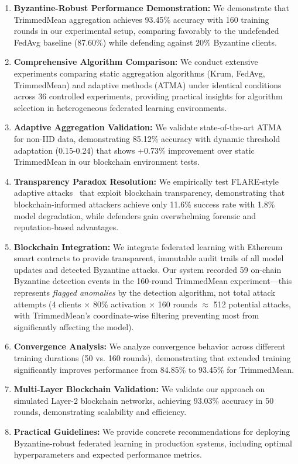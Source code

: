 \documentclass{ieeeaccess}
\begin{document}
\begin{enumerate}
    \item \textbf{Byzantine-Robust Performance Demonstration:} We demonstrate that TrimmedMean aggregation achieves 93.45\% accuracy with 160 training rounds in our experimental setup, comparing favorably to the undefended FedAvg baseline (87.60\%) while defending against 20\% Byzantine clients.
    
    \item \textbf{Comprehensive Algorithm Comparison:} We conduct extensive experiments comparing static aggregation algorithms (Krum, FedAvg, TrimmedMean) and adaptive methods (ATMA) under identical conditions across 36 controlled experiments, providing practical insights for algorithm selection in heterogeneous federated learning environments.
    
    \item \textbf{Adaptive Aggregation Validation:} We validate state-of-the-art ATMA~\cite{kalibbala2025atma} for non-IID data, demonstrating 85.12\% accuracy with dynamic threshold adaptation (0.15-0.24) that shows +0.73\% improvement over static TrimmedMean in our blockchain environment tests.
    
    \item \textbf{Transparency Paradox Resolution:} We empirically test FLARE-style adaptive attacks~\cite{baruch2019little} that exploit blockchain transparency, demonstrating that blockchain-informed attackers achieve only 11.6\% success rate with 1.8\% model degradation, while defenders gain overwhelming forensic and reputation-based advantages.
    
    \item \textbf{Blockchain Integration:} We integrate federated learning with Ethereum smart contracts to provide transparent, immutable audit trails of all model updates and detected Byzantine attacks. Our system recorded 59 on-chain Byzantine detection events in the 160-round TrimmedMean experiment---this represents \emph{flagged anomalies} by the detection algorithm, not total attack attempts (4 clients $\times$ 80\% activation $\times$ 160 rounds $\approx$ 512 potential attacks, with TrimmedMean's coordinate-wise filtering preventing most from significantly affecting the model).
    
    \item \textbf{Convergence Analysis:} We analyze convergence behavior across different training durations (50 vs. 160 rounds), demonstrating that extended training significantly improves performance from 84.85\% to 93.45\% for TrimmedMean.
    
    \item \textbf{Multi-Layer Blockchain Validation:} We validate our approach on simulated Layer-2 blockchain networks, achieving 93.03\% accuracy in 50 rounds, demonstrating scalability and efficiency.
    
    \item \textbf{Practical Guidelines:} We provide concrete recommendations for deploying Byzantine-robust federated learning in production systems, including optimal hyperparameters and expected performance metrics.
\end{enumerate}
\end{document}

